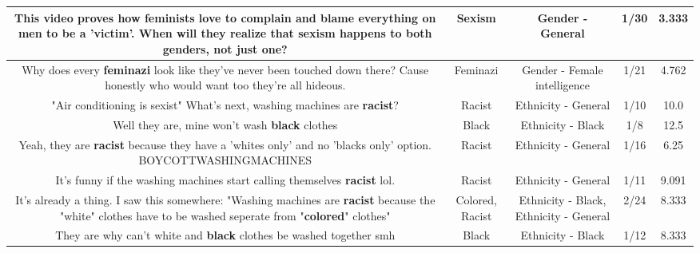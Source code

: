\documentclass[11pt]{article}
\newlength\mylength
\begin{document}
\begin{center}
\begin{longtable}{|C{.65\mylength}|C{.30\mylength}|C{.12\mylength}|C{.12\mylength}|C{.12\mylength}|}
  \small This video proves how feminists love to complain and blame everything on men to be a 'victim'. When will they realize that \textbf{sexism} happens to both genders, not just one?\normalsize   & Sexism & Gender - General & 1/30 & 3.333 \\  \hline
  \small Why does every \textbf{feminazi} look like they've never been touched down there?  Cause honestly who would want too they're all hideous.\normalsize   & Feminazi & Gender - Female intelligence & 1/21 & 4.762 \\  \hline
  \small "Air conditioning is sexist" What's next, washing machines are \textbf{racist}?\normalsize   & Racist & Ethnicity - General & 1/10 & 10.0 \\  \hline
  \small Well they are, mine won't wash \textbf{black} clothes\normalsize   & Black & Ethnicity - Black & 1/8 & 12.5 \\  \hline
  \small Yeah, they are \textbf{racist} because they have a 'whites only' and no 'blacks only' option. BOYCOTTWASHINGMACHINES\normalsize   & Racist & Ethnicity - General & 1/16 & 6.25 \\  \hline
  \small It's funny if the washing machines start calling themselves \textbf{racist} lol.\normalsize   & Racist & Ethnicity - General & 1/11 & 9.091 \\  \hline
  \small It's already a thing. I saw this somewhere: "Washing machines are \textbf{racist} because the "white" clothes have to be washed seperate from "\textbf{colored}" clothes"\normalsize   & Colored, Racist & Ethnicity - Black, Ethnicity - General & 2/24 & 8.333 \\  \hline
  \small They are why can't white and \textbf{black} clothes be washed together smh\normalsize   & Black & Ethnicity - Black & 1/12 & 8.333 \\  \hline

\end{longtable}
\end{center}
\end{document}
